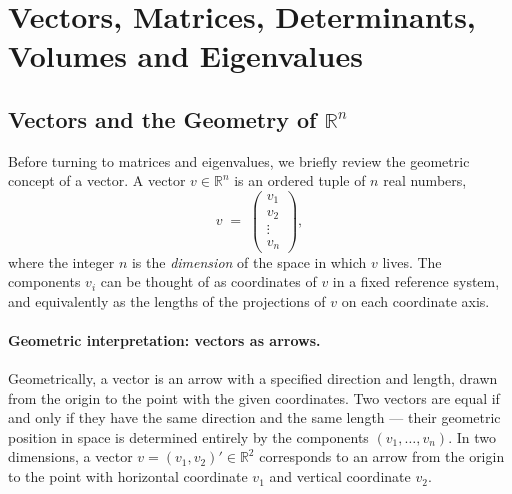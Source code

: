 \documentclass[11pt, a4paper, oneside]{article}
\begin{document}
\newpage

\section{Vectors, Matrices, Determinants, Volumes and Eigenvalues}
\subsection{Vectors and the Geometry of $\mathbb{R}^n$}
\label{sec:appendix-vectors}

Before turning to matrices and eigenvalues, we briefly review the
geometric concept of a vector. A vector $v \in \mathbb{R}^n$ is an
ordered tuple of $n$ real numbers,
\[
v \;=\; \begin{pmatrix} v_1 \\ v_2 \\ \vdots \\ v_n \end{pmatrix},
\]
where the integer $n$ is the \emph{dimension} of the space in which
$v$ lives. The components $v_i$ can be thought of as coordinates of
$v$ in a fixed reference system, and equivalently as the lengths of
the projections of $v$ on each coordinate axis.

\paragraph{Geometric interpretation: vectors as arrows.}
Geometrically, a vector is an arrow with a specified direction and
length, drawn from the origin to the point with the given
coordinates. Two vectors are equal if and only if they have the same
direction and the same length — their geometric position in space is
determined entirely by the components $(v_1, \ldots, v_n)$. In two
dimensions, a vector $v = (v_1, v_2)' \in \mathbb{R}^2$ corresponds
to an arrow from the origin to the point with horizontal coordinate
$v_1$ and vertical coordinate $v_2$.
\end{document}
